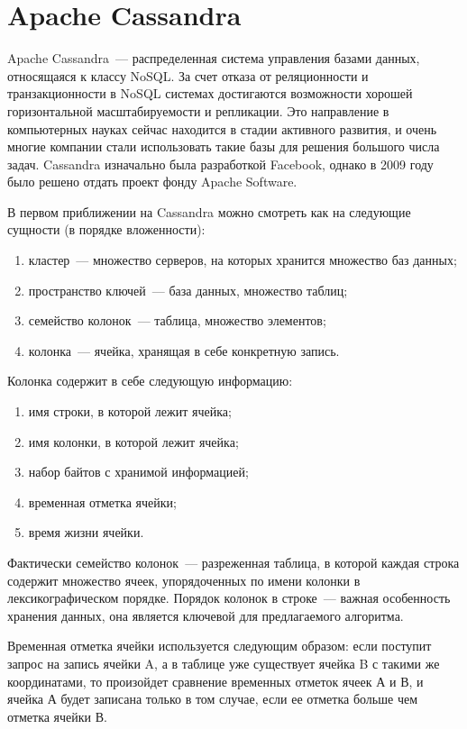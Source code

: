 \section{Apache Cassandra}

Apache Cassandra~--- распределенная система управления базами данных, относящаяся к классу NoSQL. За счет отказа от реляционности и транзакционности в NoSQL системах достигаются возможности хорошей горизонтальной масштабируемости и репликации. Это направление в компьютерных науках сейчас находится в стадии активного развития, и очень многие компании стали использовать такие базы для решения большого числа задач. Cassandra изначально была разработкой Facebook, однако в 2009 году было решено отдать проект фонду Apache Software.

В первом приближении на Cassandra можно смотреть как на следующие сущности (в порядке вложенности):

\begin{enumerate}
	\item кластер~--- множество серверов, на которых хранится множество баз данных;
	\item пространство ключей~--- база данных, множество таблиц;
	\item семейство колонок~--- таблица, множество элементов;
	\item колонка~--- ячейка, хранящая в себе конкретную запись.
\end{enumerate}

Колонка содержит в себе следующую информацию:

\begin{enumerate}
	\item имя строки, в которой лежит ячейка;
	\item имя колонки, в которой лежит ячейка;
	\item набор байтов с хранимой информацией;
	\item временная отметка ячейки;
	\item время жизни ячейки.
\end{enumerate}

Фактически семейство колонок~--- разреженная таблица, в которой каждая строка содержит множество ячеек, упорядоченных по имени колонки в лексикографическом порядке. Порядок колонок в строке~--- важная особенность хранения данных, она является ключевой для предлагаемого алгоритма.

Временная отметка ячейки используется следующим образом: если поступит запрос на запись ячейки A, а в таблице уже существует ячейка B с такими же координатами, то произойдет сравнение временных отметок ячеек А и В, и ячейка А будет записана только в том случае, если ее отметка больше чем отметка ячейки В.

